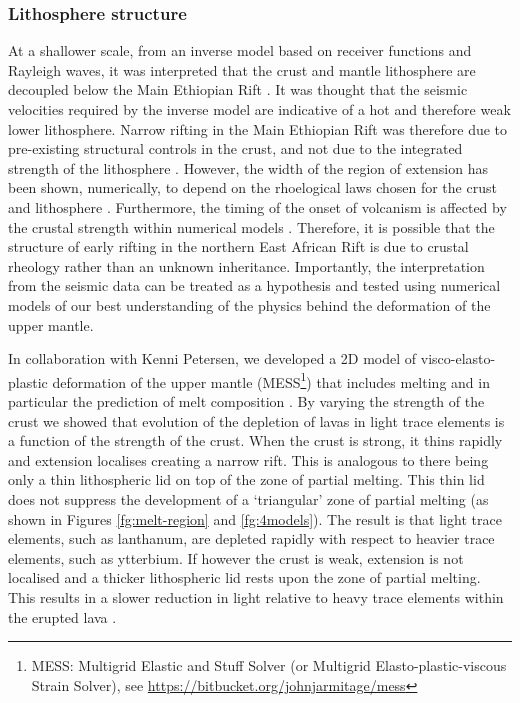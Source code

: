 \subsubsection*{Lithosphere structure}

At a shallower scale, from an inverse model based on receiver functions and Rayleigh waves, it was interpreted that the crust and mantle lithosphere are decoupled below the Main Ethiopian Rift \citep{keranen-etal-2009}. It was thought that the seismic velocities required by the inverse model are indicative of a hot and therefore weak lower lithosphere. Narrow rifting in the Main Ethiopian Rift was therefore due to pre-existing structural controls in the crust, and not due to the integrated strength of the lithosphere \citep{keranen-etal-2009}. However, the width of the region of extension has been shown, numerically, to depend on the rhoelogical laws chosen for the crust and lithosphere \citep[e.g.][]{buck-1991,brun-1999,brune-etal-2017}. Furthermore, the timing of the onset of volcanism is affected by the crustal strength within numerical models \citep{ros-etal-2017}. Therefore, it is possible that the structure of early rifting in the northern East African Rift is due to crustal rheology rather than an unknown inheritance. Importantly, the interpretation from the seismic data can be treated as a hypothesis and tested using numerical models of our best understanding of the physics behind the deformation of the upper mantle.

In collaboration with Kenni Petersen, we developed a 2D model of visco-elasto-plastic deformation of the upper mantle (MESS\footnote{MESS: Multigrid Elastic and Stuff Solver (or Multigrid Elasto-plastic-viscous Strain Solver), see \url{https://bitbucket.org/johnjarmitage/mess}}) that includes melting and in particular the prediction of melt composition \citep{petersen-etal-2015,armitage-etal-g3-2018}. By varying the strength of the crust we showed that evolution of the depletion of lavas in light trace elements is a function of the strength of the crust. When the crust is strong, it thins rapidly and extension localises creating a narrow rift. This is analogous to there being only a thin lithospheric lid on top of the zone of partial melting. This thin lid does not suppress the development of a `triangular' zone of partial melting (as shown in Figures \ref{fg:melt-region} and \ref{fg:4models}). The result is that light trace elements, such as lanthanum, are depleted rapidly with respect to heavier trace elements, such as ytterbium. If however the crust is weak, extension is not localised and a thicker lithospheric lid rests upon the zone of partial melting. This results in a slower reduction in light relative to heavy trace elements within the erupted lava \citep{armitage-etal-g3-2018}.


